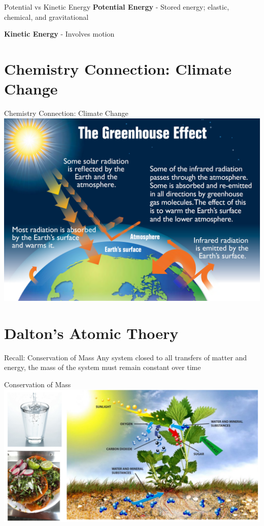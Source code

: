 \documentclass[11pt]{beamer}
\begin{document}
\begin{frame}{Potential vs Kinetic Energy}
  \textbf{Potential Energy} - Stored energy; elastic, chemical, and
  gravitational

  \textbf{Kinetic Energy} - Involves motion

  \vfill
\end{frame}

\section{Chemistry Connection: Climate Change}

\begin{frame}{Chemistry Connection: Climate Change}
  \centering
  \includegraphics[scale=1.5]{greenhouse_effect}
\end{frame}

\section{Dalton's Atomic Thoery}

\begin{frame}{Recall: Conservation of Mass}
  Any system closed to all transfers of matter and energy, the mass
  of the system must remain constant over time
\end{frame}

\begin{frame}{Conservation of Mass}
  \centering
  \includegraphics[trim={8in 0 0 0},clip,width=1\linewidth]{food_pic}
\end{frame}
\end{document}
